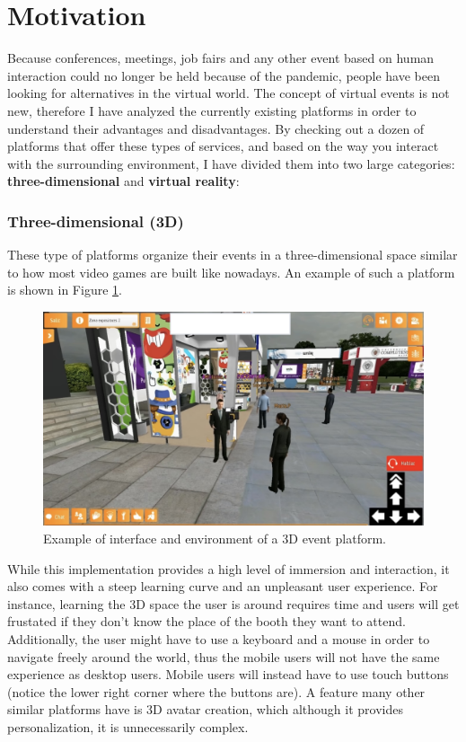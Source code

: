 \chapter*{Motivation}

Because conferences, meetings, job fairs and any other event based on human interaction could no longer be held because of the pandemic, people have been looking for alternatives in the virtual world. The concept of virtual events is not new, therefore I have analyzed the currently existing platforms in order to understand their advantages and disadvantages. By checking out a dozen of platforms that offer these types of services, and based on the way you interact with the surrounding environment, I have divided them into two large categories: \textbf{three-dimensional} and \textbf{virtual reality}:

\subsection*{Three-dimensional (3D)}
These type of platforms organize their events in a three-dimensional space similar to how most video games are built like nowadays. An example of such a platform is shown in Figure \ref{figure:motivation-3d}.

\begin{figure}[H]
	\includegraphics[width=\textwidth]{images/virtway_3d_conference.jpg}
	\caption{Example of interface and environment of a 3D event platform.}
	\label{figure:motivation-3d}
\end{figure}

While this implementation provides a high level of immersion and interaction, it also comes with a steep learning curve and an unpleasant user experience. For instance, learning the 3D space the user is around requires time and users will get frustated if they don't know the place of the booth they want to attend. Additionally, the user might have to use a keyboard and a mouse in order to navigate freely around the world, thus the mobile users will not have the same experience as desktop users. Mobile users will instead have to use touch buttons (notice the lower right corner where the buttons are). A feature many other similar platforms have is 3D avatar creation, which although it provides personalization, it is unnecessarily complex. \\


